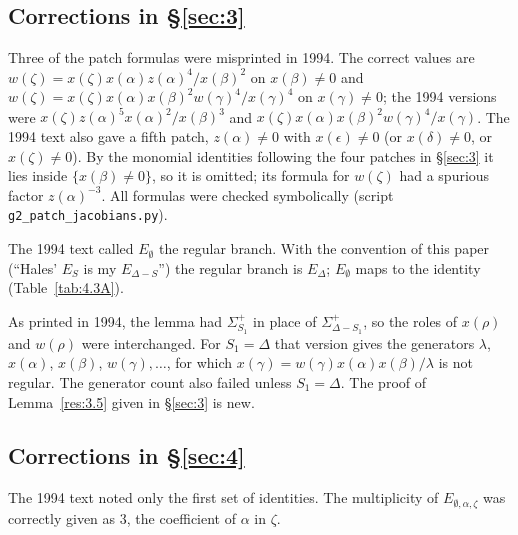 \documentclass[12pt,letterpaper]{amsart}
\theoremstyle{plain}
\theoremstyle{definition}
\theoremstyle{remark}
\theoremstyle{definition}
\begin{document}
\subsection*{Corrections in \S\ref{sec:3}}

\begin{rem26}\label{rem:3.patches}
Three of the patch formulas were misprinted in 1994. The correct values are
$w(\zeta)=x(\zeta)x(\alpha)z(\alpha)^4/x(\beta)^2$ on $x(\beta)\neq0$ and
$w(\zeta)=x(\zeta)x(\alpha)x(\beta)^2w(\gamma)^4/x(\gamma)^4$ on
$x(\gamma)\neq0$; the 1994 versions were $x(\zeta)z(\alpha)^5x(\alpha)^2/x(\beta)^3$
and $x(\zeta)x(\alpha)x(\beta)^2w(\gamma)^4/x(\gamma)$. The 1994 text also
gave a fifth patch, $z(\alpha)\neq0$ with $x(\epsilon)\neq0$ (or
$x(\delta)\neq0$, or $x(\zeta)\neq0$). By the monomial identities following the four patches in \S\ref{sec:3} it lies inside
$\{x(\beta)\neq0\}$, so it is omitted; its formula for $w(\zeta)$ had a
spurious factor $z(\alpha)^{-3}$. All formulas were checked symbolically
(script \texttt{g2\_patch\_jacobians.py}).
\end{rem26}

\begin{rem26}\label{rem:3.regular-branch}
The 1994 text called $E_\emptyset$ the regular branch. With the convention
of this paper (``Hales' $E_S$ is my $E_{\Delta -S}$'') the regular branch is
$E_\Delta$; $E_\emptyset$ maps to the identity (Table~\ref{tab:4.3A}).
\end{rem26}

\begin{rem26}\label{rem:3.5}
As printed in 1994, the lemma had $\Sigma^+_{S_1}$ in place of
$\Sigma^+_{\Delta-S_1}$, so the roles of $x(\rho)$ and $w(\rho)$ were
interchanged. For $S_1=\Delta$ that version gives the generators $\lambda$,
$x(\alpha)$, $x(\beta)$, $w(\gamma),\dots$, for which
$x(\gamma)=w(\gamma)x(\alpha)x(\beta)/\lambda$ is not regular. The generator
count also failed unless $S_1=\Delta$. The proof of Lemma~\ref{res:3.5} given in \S\ref{sec:3} is new.
\end{rem26}

\subsection*{Corrections in \S\ref{sec:4}}

\begin{rem26}\label{rem:4.redundancy}
The 1994 text noted only the first set of identities. The multiplicity of
$E_{\emptyset,\alpha,\zeta}$ was correctly given as $3$, the coefficient of
$\alpha$ in $\zeta$.
\end{rem26}
\end{document}
